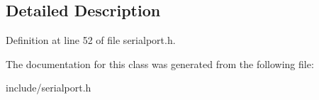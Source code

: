 \subsection{Detailed Description}


Definition at line 52 of file serialport.\-h.



The documentation for this class was generated from the following file\-:\begin{DoxyCompactItemize}
\item 
include/serialport.\-h\end{DoxyCompactItemize}
